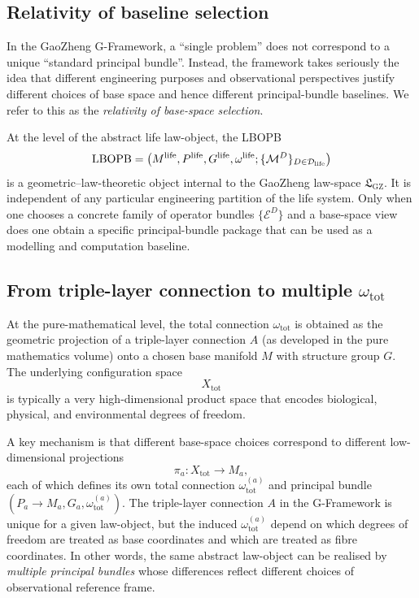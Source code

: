 \documentclass[11pt]{book}
\theoremstyle{plain}
\theoremstyle{definition}
\theoremstyle{remark}
\newcommand{\GZLS}{\ensuremath{\mathfrak{L}_{\mathrm{GZ}}}}       \newcommand{\GZLT}{\ensuremath{M_{!w}}}                           \newcommand{\GZLOC}{\ensuremath{A_M}}                             \newcommand{\GZLCurv}{\ensuremath{\mathcal{F}_{\mathrm{law}}}}
\begin{document}
\subsection{Relativity of baseline selection}

In the GaoZheng G-Framework, a ``single problem'' does not correspond to
a unique ``standard principal bundle''.
Instead, the framework takes seriously the idea that different
engineering purposes and observational perspectives justify different
choices of base space and hence different principal-bundle baselines.
We refer to this as the \emph{relativity of base-space selection}.

At the level of the abstract life law-object, the LBOPB
\[
  \mathrm{LBOPB}
  =
  \bigl(
    M^{\mathrm{life}},
    P^{\mathrm{life}},
    G^{\mathrm{life}},
    \omega^{\mathrm{life}};
    \{\mathcal{M}^D\}_{D\in\mathcal{D}_{\mathrm{life}}}
  \bigr)
\]
is a geometric--law-theoretic object internal to the GaoZheng law-space
\(\GZLS\).
It is independent of any particular engineering partition of the life
system.
Only when one chooses a concrete family of operator bundles
\(\{\mathcal{E}^D\}\) and a base-space view does one obtain a specific
principal-bundle package that can be used as a modelling and computation
baseline.



\subsection{From triple-layer connection to multiple \texorpdfstring{$\omega_{\mathrm{tot}}$}{omega\_tot}}

At the pure-mathematical level, the total connection
\(\omega_{\mathrm{tot}}\) is obtained as the geometric projection of a
triple-layer connection \(A\) (as developed in the pure mathematics
volume) onto a chosen base manifold \(M\) with structure group \(G\).
The underlying configuration space
\[
  X_{\mathrm{tot}}
\]
is typically a very high-dimensional product space that encodes
biological, physical, and environmental degrees of freedom.

A key mechanism is that different base-space choices correspond to
different low-dimensional projections
\[
  \pi_a : X_{\mathrm{tot}} \to M_a,
\]
each of which defines its own total connection
\(\omega_{\mathrm{tot}}^{(a)}\) and principal bundle
\((P_a \to M_a, G_a, \omega_{\mathrm{tot}}^{(a)})\).
The triple-layer connection \(A\) in the G-Framework is unique for a
given law-object, but the induced \(\omega_{\mathrm{tot}}^{(a)}\) depend
on which degrees of freedom are treated as base coordinates and which
are treated as fibre coordinates.
In other words, the same abstract law-object can be realised by
\emph{multiple principal bundles} whose differences reflect different
choices of observational reference frame.
\end{document}
